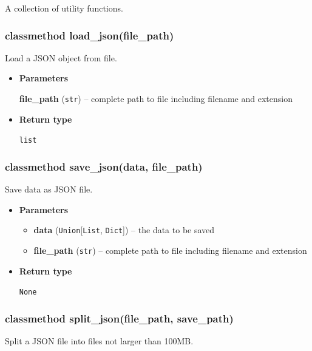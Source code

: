 A collection of utility functions.

\hypertarget{classmethod-load_jsonfile_path}{%
\subsubsection{classmethod
load\_json(file\_path)}\label{classmethod-load_jsonfile_path}}

Load a JSON object from file.

\begin{itemize}
\item
  \textbf{Parameters}

  \textbf{file\_path} (\texttt{str}) -- complete path to file including
  filename and extension
\item
  \textbf{Return type}

  \texttt{list}
\end{itemize}

\hypertarget{classmethod-save_jsondata-file_path}{%
\subsubsection{classmethod save\_json(data,
file\_path)}\label{classmethod-save_jsondata-file_path}}

Save data as JSON file.

\begin{itemize}
\item
  \textbf{Parameters}

  \begin{itemize}
  \item
    \textbf{data} (\texttt{Union}{[}\texttt{List}, \texttt{Dict}{]}) --
    the data to be saved
  \item
    \textbf{file\_path} (\texttt{str}) -- complete path to file
    including filename and extension
  \end{itemize}
\item
  \textbf{Return type}

  \texttt{None}
\end{itemize}

\hypertarget{classmethod-split_jsonfile_path-save_path}{%
\subsubsection{classmethod split\_json(file\_path,
save\_path)}\label{classmethod-split_jsonfile_path-save_path}}

Split a JSON file into files not larger than 100MB.

